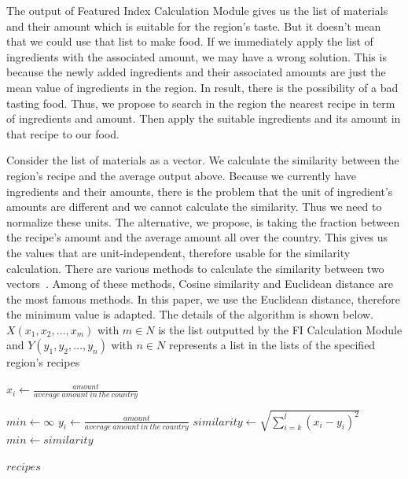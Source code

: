 The output of Featured Index Calculation Module gives us the list of materials and their amount which is suitable for the region's taste. But it doesn't mean that we could use that list to make food. If we immediately apply the list of ingredients with the associated amount, we may have a wrong solution. This is because the newly added ingredients and their associated amounts are just the mean value of ingredients in the region. In result, there is the possibility of a bad tasting food. Thus, we propose to search in the region the nearest recipe in term of ingredients and amount. Then apply the suitable ingredients and its amount in that recipe to our food.        

Consider the list of materials as a vector. We calculate the similarity between the region's recipe and the average output above. Because we currently have ingredients and their amounts, there is the problem that the unit of ingredient's amounts are different and we cannot calculate the similarity. Thus we need to normalize these units. The alternative, we propose, is taking the fraction between the recipe's amount and the average amount all over the country. This gives us the values that are unit-independent, therefore usable for the similarity calculation. There are various methods to calculate the similarity between two vectors~\cite{cosine,euclidean,Qian:2004:SEC:967900.968151}. Among of these methods, Cosine similarity and Euclidean distance are the most famous methods. In this paper, we use the Euclidean distance, therefore the minimum value is adapted. The details of the algorithm is shown below. $X(x_1,x_2,\ldots,x_m)$ with $m \in N $ is the list outputted by the FI Calculation Module and $Y(y_1,y_2,\ldots,y_n)$ with $n \in N $ represents a list in the lists of the specified region's recipes 


\begin{algorithmic}

\State $ x_i \gets \frac{\displaystyle amount}{\displaystyle average\ amount\ in\ the\ country}$
\EndFor

\State $min \gets \infty $
\State $ y_i \gets \frac{\displaystyle amount}{\displaystyle average\ amount\ in\ the\ country}$
\EndFor
\State $ similarity \gets \sqrt{\displaystyle \sum^l_{i=k}{(x_i-y_i)^2}}$
\State $ min \gets similarity $
\EndIf
\EndFor

\Return $recipes$


\end{algorithmic}

